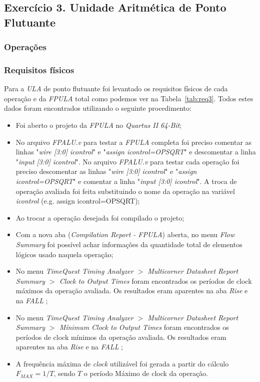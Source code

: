 \documentclass[12pt]{article}
\begin{document}
\subsection{Exercício 3. Unidade Aritmética de Ponto Flutuante }
\label{subsec:ulafloat}

\subsubsection{Operações}
\label{subsubsec:3op}


\subsubsection{Requisitos físicos}
\label{subsubsec:fpulafis}

Para a \textit{ULA} de ponto flutuante foi levantado os requisitos físicos de cada operação e da \textit{FPULA} total como podemos ver na Tabela~\ref{tab:req3}. Todos estes dados foram encontrados utilizando o seguinte procedimento:

\begin{itemize}
	\item Foi aberto o projeto da \textit{FPULA} no \textit{Quartus II 64-Bit};
	\item No arquivo \textit{FPALU.v} para testar a \textit{FPULA} completa foi preciso comentar as linhas "\textit{wire [3:0] icontrol}" e "\textit{assign icontrol=OPSQRT}" e descomentar a linha "\textit{input [3:0] icontrol}". No arquivo \textit{FPALU.v} para testar cada operação foi preciso descomentar as linhas "\textit{wire [3:0] icontrol}" e "\textit{assign icontrol=OPSQRT}" e comentar a linha "\textit{input [3:0] icontrol}". A troca de operação avaliada foi feita substituindo o nome da operação na variável \textit{icontrol} (e.g. assign icontrol=OPSQRT);
	\item Ao trocar a operação desejada foi compilado o projeto;
	\item Com a nova aba (\textit{Compilation Report - FPULA}) aberta, no menu \textit{Flow Summary} foi possível achar informações da quantidade total de elementos lógicos usado naquela operação;
	\item No menu \textit{TimeQuest Timing Analyzer $>$ Multicorner Datasheet Report Summary $>$ Clock to Output Times} foram encontrados os períodos de clock máximos da operação avaliada. Os resultados eram aparentes na aba \textit{Rise} e na \textit{FALL} \cite{altera};
	\item No menu \textit{TimeQuest Timing Analyzer $>$ Multicorner Datasheet Report Summary $>$ Mínimum Clock to Output Times} foram encontrados os períodos de clock mínimos da operação avaliada. Os resultados eram aparentes na aba \textit{Rise} e na \textit{FALL} \cite{altera};
	\item A frequência máxima de \textit{clock} utilizável foi gerada a partir do cálculo $F_{MAX} = 1/T$, sendo $T$ o período Máximo de clock da operação.
\end{itemize}
\end{document}

